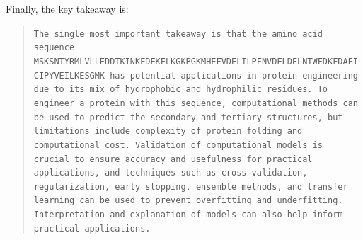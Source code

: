 \documentclass{article}
\begin{document}
%
Finally, the key takeaway is:
\begin{quote}
\small\texttt{The single most important takeaway is that the amino acid sequence MSKSNTYRMLVLLEDDTKINKEDEKFLKGKPGKMHEFVDELILPFNVDELDELNTWFDKFDAEICIPYVEILKESGMK has potential applications in protein engineering due to its mix of hydrophobic and hydrophilic residues. To engineer a protein with this sequence, computational methods can be used to predict the secondary and tertiary structures, but limitations include complexity of protein folding and computational cost. Validation of computational models is crucial to ensure accuracy and usefulness for practical applications, and techniques such as cross-validation, regularization, early stopping, ensemble methods, and transfer learning can be used to prevent overfitting and underfitting. Interpretation and explanation of models can also help inform practical applications.}
\end{quote}
\end{document}
